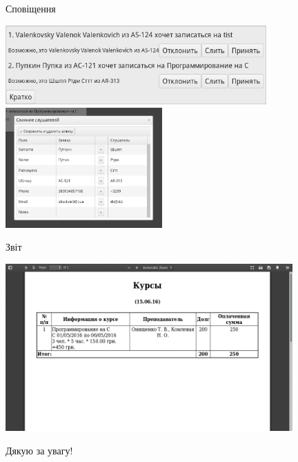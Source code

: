\documentclass{beamer}
\begin{document}
\begin{frame}{\fn Сповіщення}
\begin{center}
\includegraphics[width=10cm]{scrns/notifications1.png}\\
\includegraphics[width=6cm]{scrns/notifications2.png}
\end{center}
\end{frame}
\begin{frame}{\fn Звіт}
\begin{center}
\includegraphics[width=11cm]{scrns/report.png}
\end{center}
\end{frame}
\begin{frame}{}
\begin{center}
{\fontsize{48pt}{48pt}\selectfont Дякую за увагу!}
\end{center}
\end{frame}
\end{document}
